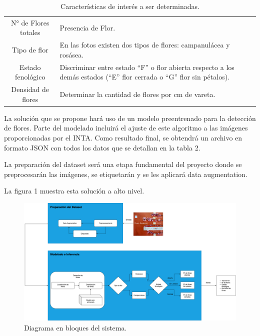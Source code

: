 \documentclass[
11pt, %
]{charter}
\begin{document}
\renewcommand{\tablename}{Tabla}
\begin{table}[ht]
\begin{center}
\begin{tabularx}{\textwidth}{| c | X | }
\hline
\rowcolor[HTML]{C0C0C0}
\multicolumn{2}{ |c| }{Características de interés a ser determinadas} \\ \hline

  N° de Flores totales  & Presencia de Flor. \\ \hline
  Tipo de flor          & En las fotos existen dos tipos de flores: campanulácea y rosásea. \\ \hline
  Estado fenológico     & Discriminar entre estado “F” o flor abierta respecto a los demás estados (“E” flor cerrada o “G” flor sin pétalos). \\ \hline
  Densidad de flores    & Determinar la cantidad de flores por cm de vareta. \\ \hline
  
\end{tabularx}
\caption{Características de interés a ser determinadas.}
\end{center}
\end{table}

La solución que se propone hará uso de un modelo preentrenado para la detección de flores. Parte del modelado incluirá el ajuste de este algoritmo a las imágenes proporcionadas por el INTA. Como resultado final, se obtendrá un archivo en formato JSON con todos los datos que se detallan en la tabla 2.

La preparación del dataset será una etapa fundamental del proyecto donde se preprocesarán las imágenes, se etiquetarán y se les aplicará data augmentation. 

La figura 1 muestra esta solución a alto nivel.

\begin{figure}[htpb]
\centering 
\includegraphics[width=1\textwidth]{./Figuras/Tesis3.drawio.png}
\caption{Diagrama en bloques del sistema.}
\label{fig:diagBloques}
\end{figure}
\end{document}
